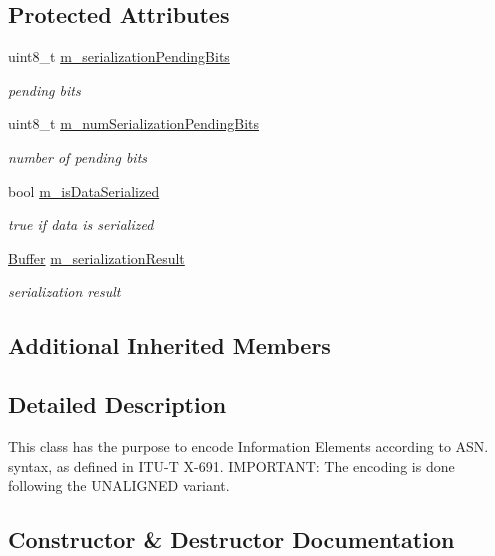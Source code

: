 \subsection*{Protected Attributes}
\begin{DoxyCompactItemize}
\item 
uint8\+\_\+t \hyperlink{classns3_1_1Asn1Header_ad48f6854caeba65c2631675cf416a2c9}{m\+\_\+serialization\+Pending\+Bits}
\begin{DoxyCompactList}\small\item\em pending bits \end{DoxyCompactList}\item 
uint8\+\_\+t \hyperlink{classns3_1_1Asn1Header_a663fc3287a1e7e4c383575e432480e6c}{m\+\_\+num\+Serialization\+Pending\+Bits}
\begin{DoxyCompactList}\small\item\em number of pending bits \end{DoxyCompactList}\item 
bool \hyperlink{classns3_1_1Asn1Header_ae39d42f09e8ec85d8180843625fc92ba}{m\+\_\+is\+Data\+Serialized}
\begin{DoxyCompactList}\small\item\em true if data is serialized \end{DoxyCompactList}\item 
\hyperlink{classns3_1_1Buffer}{Buffer} \hyperlink{classns3_1_1Asn1Header_a758b74023ea5bf40941af6f0a6a66058}{m\+\_\+serialization\+Result}
\begin{DoxyCompactList}\small\item\em serialization result \end{DoxyCompactList}\end{DoxyCompactItemize}
\subsection*{Additional Inherited Members}


\subsection{Detailed Description}
This class has the purpose to encode Information Elements according to A\+S\+N. syntax, as defined in I\+T\+U-\/T X-\/691. I\+M\+P\+O\+R\+T\+A\+NT\+: The encoding is done following the U\+N\+A\+L\+I\+G\+N\+ED variant. 

\subsection{Constructor \& Destructor Documentation}
